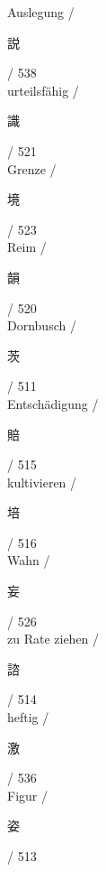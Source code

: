  \vspace{0.2cm}Auslegung / {\Huge \begin{CJK}{UTF8}{min} 説 \end{CJK}} / 538\\
 \vspace{0.2cm}urteilsfähig / {\Huge \begin{CJK}{UTF8}{min} 識 \end{CJK}} / 521\\
 \vspace{0.2cm}Grenze / {\Huge \begin{CJK}{UTF8}{min} 境 \end{CJK}} / 523\\
 \vspace{0.2cm}Reim / {\Huge \begin{CJK}{UTF8}{min} 韻 \end{CJK}} / 520\\
 \vspace{0.2cm}Dornbusch / {\Huge \begin{CJK}{UTF8}{min} 茨 \end{CJK}} / 511\\
 \vspace{0.2cm}Entschädigung / {\Huge \begin{CJK}{UTF8}{min} 賠 \end{CJK}} / 515\\
 \vspace{0.2cm}kultivieren / {\Huge \begin{CJK}{UTF8}{min} 培 \end{CJK}} / 516\\
 \vspace{0.2cm}Wahn / {\Huge \begin{CJK}{UTF8}{min} 妄 \end{CJK}} / 526\\
 \vspace{0.2cm}zu Rate ziehen / {\Huge \begin{CJK}{UTF8}{min} 諮 \end{CJK}} / 514\\
 \vspace{0.2cm}heftig / {\Huge \begin{CJK}{UTF8}{min} 激 \end{CJK}} / 536\\
 \vspace{0.2cm}Figur / {\Huge \begin{CJK}{UTF8}{min} 姿 \end{CJK}} / 513\\
